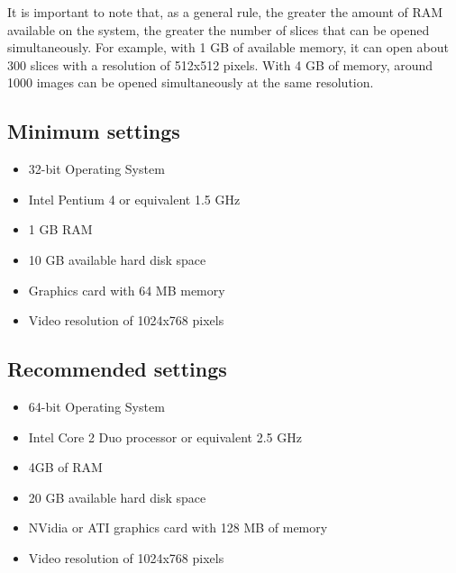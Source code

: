 It is important to note that, as a general rule, the greater the amount of RAM available on the system, the greater the number of slices that can be opened simultaneously. For example, with 1 GB of available memory, it can open about 300 slices with a resolution of 512x512 pixels. With 4 GB of memory, around 1000 images can be opened simultaneously at the same resolution.

\subsection{Minimum settings}

\begin{itemize}
	\item 32-bit Operating System
	\item Intel Pentium 4 or equivalent 1.5 GHz
	\item 1 GB RAM
	\item 10 GB available hard disk space
	\item Graphics card with 64 MB memory
	\item Video resolution of 1024x768 pixels
\end{itemize}


\subsection{Recommended settings}
\begin{itemize}
	\item 64-bit Operating System
	\item Intel Core 2 Duo processor or equivalent 2.5 GHz
	\item 4GB of RAM
	\item 20 GB available hard disk space
	\item NVidia or ATI graphics card with 128 MB of memory
	\item Video resolution of 1024x768 pixels
\end{itemize}


